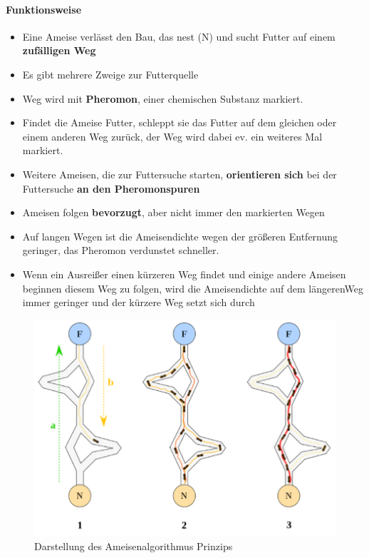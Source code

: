 \paragraph{Funktionsweise}
\begin{itemize}
	\item Eine Ameise verlässt den Bau, das nest (N) und sucht Futter auf einem \textbf{zufälligen Weg}
	\item Es gibt mehrere Zweige zur Futterquelle
	\item Weg wird mit \textbf{Pheromon}, einer chemischen Substanz markiert.
	\item Findet die Ameise Futter, schleppt sie das Futter auf dem gleichen oder einem anderen Weg zurück, der Weg wird dabei ev. ein weiteres Mal markiert.
	\item Weitere Ameisen, die zur Futtersuche starten, \textbf{orientieren sich} bei der Futtersuche \textbf{an den Pheromonspuren}
	\item Ameisen folgen \textbf{bevorzugt}, aber nicht immer den markierten Wegen
	\item Auf langen Wegen ist die Ameisendichte wegen der größeren Entfernung geringer, das Pheromon verdunstet schneller.
	\item Wenn ein Ausreißer einen kürzeren Weg findet und einige andere Ameisen beginnen diesem Weg zu folgen, wird die Ameisendichte auf dem längerenWeg immer geringer und der kürzere Weg setzt sich durch
\end{itemize}
\begin{figure}[H]
	\begin{center}
		\includegraphics[scale=0.6]{Resources/PNG/AmeisenAlgorithmus.PNG}
		\caption{Darstellung des Ameisenalgorithmus Prinzips}
		\label{fig:PNG/AmeisenAlgorithmus.PNG}
	\end{center}
\end{figure}
